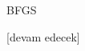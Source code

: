 \documentclass[12pt,fleqn]{article}\usepackage{../../common}
\begin{document}
BFGS 

[devam edecek]

\inputminted[fontsize=\footnotesize]{python}{bfgs.py}
\end{document}
